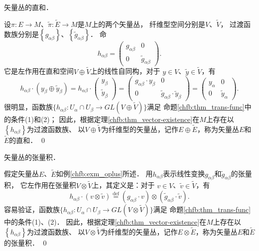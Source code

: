 \begin{example}\label{chfb:exm_oplus}
    矢量丛的直和．
\end{example}
设$\pi: E \rightarrow M$、$\tilde{\pi}: \widetilde{E} \rightarrow M$是$M$上的两个矢量丛，
纤维型空间分别是$V$、$\tilde{V}$，
过渡函数族分别是$\left\{g_{\alpha \beta}\right\}$、$\left\{\tilde{g}_{\alpha \beta}\right\}$． 命
\begin{equation*}
    h_{\alpha \beta}=\begin{pmatrix}
        g_{\alpha \beta} & 0 \\ 0 & \tilde{g}_{\alpha \beta}
    \end{pmatrix}.
\end{equation*}
它是左作用在直和空间$V \oplus \tilde{V}$上的线性自同构，对于 $y \in V$、$ \tilde{y} \in \tilde{V}$，有
\begin{equation*}
    h_{\alpha \beta} \cdot (y_\beta \oplus \tilde{y}_\beta)
    =h_{\alpha \beta} \cdot \begin{pmatrix}
        y_{\beta} \\ \tilde{y}_{\beta}
    \end{pmatrix}
    =\begin{pmatrix}
        g_{\alpha \beta}\cdot  y_{\beta} & 0 \\ 0 & \tilde{g}_{\alpha \beta}\cdot  \tilde{y}_{\beta}
    \end{pmatrix}
    =\begin{pmatrix}
        y_{\alpha} & 0 \\ 0 & \tilde{y}_{\alpha}
    \end{pmatrix} .
\end{equation*}
很明显，函数族$\{h_{\alpha \beta}: U_\alpha \cap U_\beta \rightarrow GL(V \oplus \tilde{V})\}$满足
命题\ref{chfb:thm_trans-func}中的条件(1)和(2)；
因此，根据定理\ref{chfb:thm_vector-existence}在$M$上存在以$\left\{h_{\alpha \beta}\right\}$为过渡函数族、
以$V\oplus \tilde{V}$为纤维型的矢量丛，记作$E\oplus\widetilde{E}$，称为矢量丛$E$和$\widetilde{E}$的直和．
\qed




\begin{example}\label{chfb:exm_otimes}
    矢量丛的张量积．
\end{example}
假定矢量丛$E$、$\tilde{E}$如例\ref{chfb:exm_oplus}所述．
用$h_{\alpha \beta}$表示线性变换$g_{\alpha \beta}$和$\tilde{g}_{\alpha \beta}$的张量积，
它左作用在张量积$V \otimes \tilde{V}$上，其定义是：对于 $v \in V$、$ \tilde{v} \in \tilde{V}$，有
\begin{equation*}
    h_{\alpha \beta} \cdot(v \otimes \tilde{v})
    \overset{\mathrm {def}}{=}\left(g_{\alpha \beta} \cdot v\right) \otimes
    \left(\tilde{g}_{\alpha \beta} \cdot \tilde{v}\right) .
\end{equation*}
容易验证，函数族$\{h_{\alpha \beta}: U_\alpha \cap U_\beta \rightarrow GL(V \otimes \tilde{V})\}$满足
命题\ref{chfb:thm_trans-func}中的条件(1)、(2)．
因此，根据定理\ref{chfb:thm_vector-existence}在$M$上存在以$\left\{h_{\alpha \beta}\right\}$为过渡函数族、
以$V\otimes\tilde{V}$为纤维型的矢量丛，记作$E \otimes \tilde{E}$，称为矢量丛$E$和$\tilde{E}$ 的张量积．
\qed

